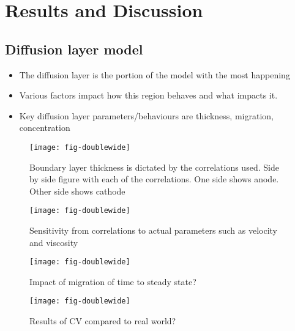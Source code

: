 \documentclass[journal=mamobx]{achemso}
\begin{document}

\section{Results and Discussion}
\subsection{Diffusion layer model}
\begin{itemize}
  \item The diffusion layer is the portion of the model with the most happening
  \item Various factors impact how this region behaves and what impacts it.
  \item Key diffusion layer parameters/behaviours are thickness, migration, concentration 
\end{itemize}
\begin{figure*}[tbp]
  \texttt{[image: fig-doublewide]}
  \caption{Boundary layer thickness is dictated by the correlations used. Side by side figure with each of the correlations. One side shows anode. Other side shows cathode }
  \label{fig-doublewide}
\end{figure*}
\begin{figure*}[tbp]
  \texttt{[image: fig-doublewide]}
  \caption{Sensitivity from correlations to actual parameters such as velocity and viscosity}
  \label{fig-doublewide}
\end{figure*}
\begin{figure*}[tbp]
  \texttt{[image: fig-doublewide]}
  \caption{Impact of migration of time to steady state?}
  \label{fig-doublewide}
\end{figure*}
\begin{figure*}[tbp]
  \texttt{[image: fig-doublewide]}
  \caption{Results of CV compared to real world?}
  \label{fig-doublewide}
\end{figure*}
\end{document}
